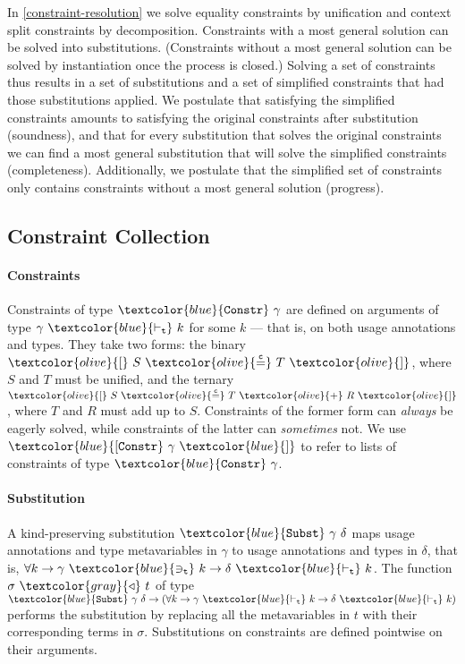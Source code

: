 \documentclass[sigplan,screen,review]{acmart}
\theoremstyle{definition}\newtheorem{mytheorem}{Theorem}[section]
\newcommand{\constr}[1]{\textcolor{olive}{\mathtt{#1}}}
\newcommand{\func}[1]{\textcolor{gray}{\mathtt{#1}}}
\newcommand{\type}[1]{\textcolor{blue}{\mathtt{#1}}}
\newcommand{\tvar}[2]{#1 ~\type{\ni_t}~ #2}
\newcommand{\tkind}[2]{#1 ~\type{\vdash_t}~ #2}
\newcommand{\tConstr}[1]{\type{Constr} ~ #1}
\newcommand{\tConstrs}[1]{\type{[Constr} ~ #1 ~ \type{]}}
\newcommand{\subst}[2]{#1 ~ \func{\triangleleft} ~ #2}
\newcommand{\tSubst}[2]{\type{Subst}~#1~#2}
\newcommand{\eqconstr}[2]{\constr{[} ~ #1 ~ \constr{\stackrel{c}{=}} ~ #2 ~ \constr{]}}
\newcommand{\sumconstr}[3]{\constr{[} ~ #1 ~ \constr{\stackrel{c}{=}} ~ #2 ~ \constr{+} ~ #3 ~ \constr{]}}
\begin{document}
In \autoref{constraint-resolution} we solve equality constraints by unification and context split constraints by decomposition.
Constraints with a most general solution can be solved into substitutions.
(Constraints without a most general solution can be solved by instantiation once the process is closed.)
Solving a set of constraints thus results in a set of substitutions and a set of simplified constraints that had those substitutions applied.
We postulate that satisfying the simplified constraints amounts to satisfying the original constraints after substitution (soundness), and that for every substitution that solves the original constraints we can find a most general substitution that will solve the simplified constraints (completeness).
Additionally, we postulate that the simplified set of constraints only contains constraints without a most general solution (progress).

\subsection{Constraint Collection}
\label{constraint-collection}

\paragraph{Constraints}

Constraints of type $\tConstr{\gamma}$ are defined on arguments of type $\tkind{\gamma}{k}$ for some $k$ --- that is, on both usage annotations and types.
They take two forms: the binary $\eqconstr{S}{T}$, where $S$ and $T$ must be unified, and the ternary $\sumconstr{S}{T}{R}$, where $T$ and $R$ must add up to $S$.
Constraints of the former form can \emph{always} be eagerly solved, while constraints of the latter can \emph{sometimes} not.
We use $\tConstrs{\gamma}$ to refer to lists of constraints of type $\tConstr{\gamma}$.

\paragraph{Substitution}

A kind-preserving substitution $\tSubst{\gamma}{\delta}$ maps usage annotations and type metavariables in $\gamma$ to usage annotations and types in $\delta$, that is, $\forall k \to \tvar{\gamma}{k} \to \tkind{\delta}{k}$.
The function $\subst{\sigma}{t}$ of type $\tSubst{\gamma}{\delta} \to (\forall k \to \tkind{\gamma}{k} \to \tkind{\delta}{k})$ performs the substitution by replacing all the metavariables in $t$ with their corresponding terms in $\sigma$.
Substitutions on constraints are defined pointwise on their arguments.
\end{document}

